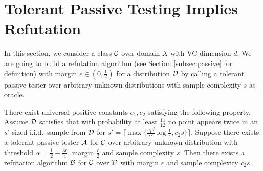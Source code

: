 \section{Tolerant Passive Testing Implies Refutation}
\label{sec:refutation}
In this section, we consider a class ${\mathcal{C}}$ over domain $X$ with VC-dimension $d$. We are going to build a refutation algorithm (see Section \ref{subsec:passive} for definition) with margin $\epsilon\in(0,\frac 12)$ for a distribution ${\mathcal{D}}$ by calling a tolerant passive tester over arbitrary unknown distributions with sample complexity $s$ as oracle.

\begin{lemma}
There exist universal positive constants $c_1,c_2$ satisfying the following property. Assume ${\mathcal{D}}$ satisfies that with probability at least $\frac {11}{12}$ no point appears twice in an $s'$-sized i.i.d.\ sample from ${\mathcal{D}}$ for $s'=\lceil\max\{\frac{{c_1}d}{\epsilon^2}\log\frac1\epsilon,c_2s\}\rceil$. Suppose there exists a tolerant passive tester ${\mathcal{A}}$ for ${\mathcal{C}}$ over arbitrary unknown distribution with threshold $\alpha=\frac 12-\frac{3\epsilon}4$, margin $\frac\epsilon 2$ and sample complexity $s$. Then there exists a refutation algorithm ${\mathcal B}$ for ${\mathcal{C}}$ over ${\mathcal{D}}$ with margin $\epsilon$ and sample complexity $c_2s$.
\end{lemma}
